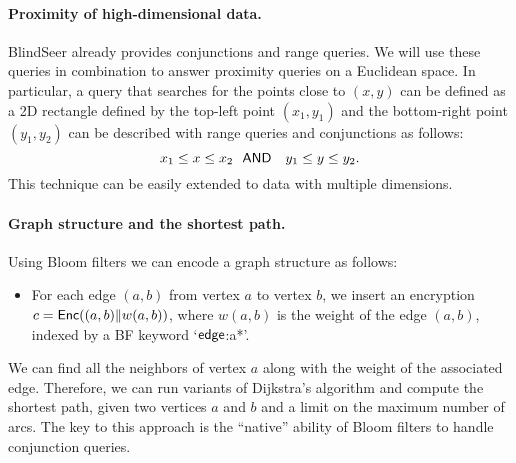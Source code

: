 \paragraph{Proximity of high-dimensional data.}
BlindSeer already provides conjunctions and range queries. We will
use these queries in combination to answer proximity queries on a Euclidean space.
In particular, a query that searches for the points close to $(x, y)$ can be defined as a 2D rectangle defined by the top-left point $(x_1, y_1)$ and the
bottom-right point $(y_1, y_2)$ can be described with range queries and
conjunctions as follows: $$ x_1 \le x \le x_2 ~~{\sf AND}~~~ y_1 \le y \le y_2.
$$ This technique can be easily extended to data with multiple dimensions. 

\paragraph{Graph structure and the shortest path.}
Using Bloom filters we can encode a graph structure as follows:
\begin{itemize}
\item For each edge $(a, b)$ from vertex $a$ to vertex $b$, we insert an
  encryption $c = \mathsf{Enc}((a,b) \| w(a,b) )$, where $w(a,b)$ is the weight of the edge
    $(a,b)$, indexed by a BF keyword `$\sf edge$:a*'. 
\end{itemize}

\noindent
We can find all the neighbors of vertex $a$ along with the weight of the
associated edge. Therefore, we can run variants of Dijkstra's algorithm and
compute the shortest path, given two vertices $a$ and $b$ and a limit
on the maximum number of arcs. The key to this approach is the ``native''
ability of Bloom filters to handle conjunction queries.
%


\def\HHH{{\cal H}}
